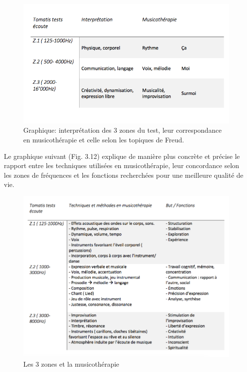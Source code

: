 \begin{figure}
	\centering
	\includegraphics[width=1.0\linewidth]{images/testinterpmusico}
	\caption[ L'interprétation des 3 zones et leur correspondance
	en musicothérapie]{Graphique: interprétation des 3 zones du
		test, leur correspondance en musicothérapie et celle selon les
		topiques de Freud.}
	
	\label{graphiquecolonnetestmusico}
\end{figure}
 \clearpage
 Le graphique suivant (Fig. 3.12) explique de manière plus concrète et précise le rapport entre les 
 techniques 
 utilisées en musicothérapie, leur concordance selon les zones de fréquences et les fonctions 
 recherchées pour 
 une meilleure qualité de vie.
\begin{figure}[tbh]
	\centering
	\includegraphics[width=1.0\linewidth]{images/testtechnmethbut}
	\caption[Zones du test avec la musicothérapie]{Les 3
		zones et la musicothérapie}
	
	\label{testbutetfonction}
\end{figure}


